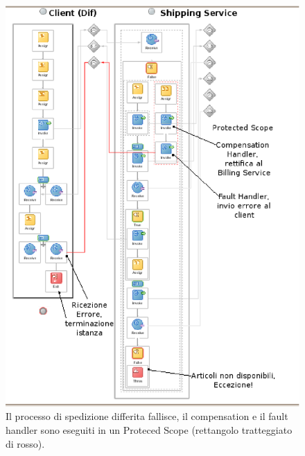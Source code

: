 \begin{figure}[p]
\begin{center}
  \includegraphics[scale=0.90,clip]{blide/dia/Sim4}
   \caption[Blide, simulazione 4]{Il processo di spedizione differita fallisce,
   il compensation e il fault handler sono eseguiti in un Proteced Scope
   (rettangolo tratteggiato di rosso).}
  \label{fig:Sim4}
\end{center}
\end{figure}


